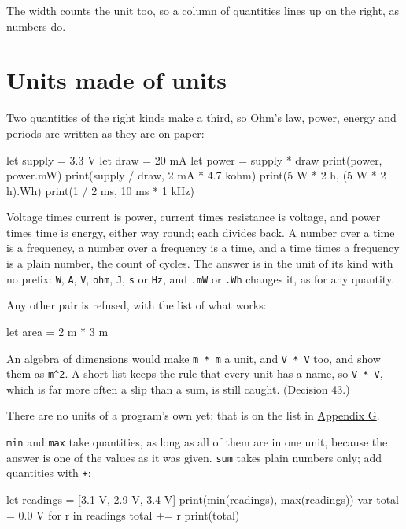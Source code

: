The width counts the unit too, so a column of quantities lines up on
the right, as numbers do.

\section{Units made of units}

Two quantities of the right kinds make a third, so Ohm's law, power,
energy and periods are written as they are on paper:

\begin{zeno}
let supply = 3.3 V
let draw = 20 mA
let power = supply * draw
print(power, power.mW)
print(supply / draw, 2 mA * 4.7 kohm)
print(5 W * 2 h, (5 W * 2 h).Wh)
print(1 / 2 ms, 10 ms * 1 kHz)
\end{zeno}

Voltage times current is power, current times resistance is voltage,
and power times time is energy, either way round; each divides back.
A number over a time is a frequency, a number over a frequency is a
time, and a time times a frequency is a plain number, the count of
cycles. The answer is in the unit of its kind with no prefix:
\verb|W|, \verb|A|, \verb|V|, \verb|ohm|, \verb|J|, \verb|s| or
\verb|Hz|, and \verb|.mW| or \verb|.Wh| changes it, as for any
quantity.

Any other pair is refused, with the list of what works:

\begin{zeno}[fails=yes]
let area = 2 m * 3 m
\end{zeno}

\begin{why}
An algebra of dimensions would make \verb|m * m| a unit, and
\verb|V * V| too, and show them as \verb|m^2|. A short list keeps
the rule that every unit has a name, so \verb|V * V|, which is far
more often a slip than a sum, is still caught. (Decision 43.)
\end{why}

There are no units of a program's own yet; that is on the list in
\hyperref[app-limits]{Appendix G}.

\verb|min| and \verb|max| take quantities, as long as all of them are
in one unit, because the answer is one of the values as it was given.
\verb|sum| takes plain numbers only; add quantities with \verb|+|:

\begin{zeno}
let readings = [3.1 V, 2.9 V, 3.4 V]
print(min(readings), max(readings))
var total = 0.0 V
for r in readings {
    total += r
}
print(total)
\end{zeno}

